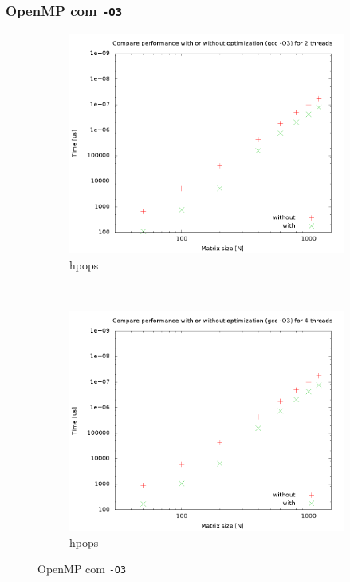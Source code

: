 \documentclass[a4paper, 12pt]{article}
\begin{document}
\subsubsection{OpenMP com \texttt{-O3}}
\begin{figure}[H]
    \centering
    \begin{subfigure}[H]{0.5\textwidth}
        \includegraphics[width=\textwidth]{hpops_cmp_optimization-2t}
        \caption{hpops}
        \label{fig:hpops_o3_2t}
    \end{subfigure}%
    ~ %
    \begin{subfigure}[H]{0.5\textwidth}
        \includegraphics[width=\textwidth]{hpops_cmp_optimization-4t}
        \caption{hpops}
        \label{fig:hpops_o3_4t}
    \end{subfigure}
    \caption{OpenMP com \texttt{-O3}}\label{fig:animals}
\end{figure}
\end{document}
